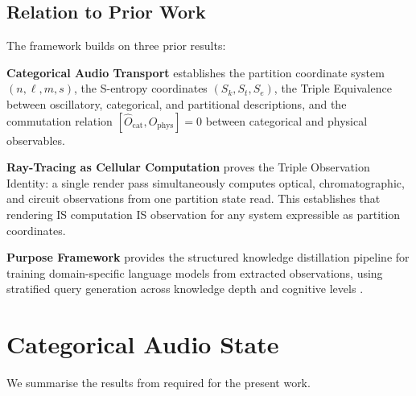 \documentclass[11pt,twocolumn,a4paper]{article}
\newcommand{\Ocat}{\hat{O}_{\mathrm{cat}}}
\newcommand{\Ophys}{\hat{O}_{\mathrm{phys}}}
\newcommand{\Sk}{S_k}
\newcommand{\St}{S_t}
\newcommand{\Se}{S_e}
\begin{document}
\subsection{Relation to Prior Work}

The framework builds on three prior results:

\textbf{Categorical Audio Transport} \citep{sachikonye2026categorical}
establishes the partition coordinate system $(n, \ell, m, s)$, the
S-entropy coordinates $(\Sk, \St, \Se)$, the Triple Equivalence
between oscillatory, categorical, and partitional descriptions, and the
commutation relation $[\Ocat, \Ophys] = 0$ between categorical and
physical observables.

\textbf{Ray-Tracing as Cellular Computation}
\citep{sachikonye2026raytracing} proves the Triple Observation
Identity: a single render pass simultaneously computes optical,
chromatographic, and circuit observations from one partition state read.
This establishes that rendering IS computation IS observation for any
system expressible as partition coordinates.

\textbf{Purpose Framework} provides the structured knowledge
distillation pipeline for training domain-specific language models from
extracted observations, using stratified query generation across
knowledge depth and cognitive levels \citep{bloom1956taxonomy,
hinton2015distilling, hu2021lora}.


\section{Categorical Audio State}
\label{sec:categorical}

We summarise the results from \citet{sachikonye2026categorical} required
for the present work.
\end{document}

